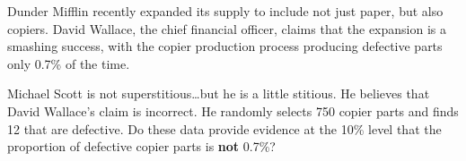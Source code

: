 \documentclass[noanswers]{exam}
\begin{document}
\begin{questions}

\newpage

\question Dunder Mifflin recently expanded its supply to include not just paper, but also copiers. David Wallace, the chief financial officer, claims that the expansion is a smashing success, with the copier production process producing defective parts only 0.7\% of the time.
    
    \vspace{3mm}
        
    Michael Scott is not superstitious\dots but he is a little stitious. He believes that David Wallace's claim is incorrect. He randomly selects 750 copier parts and finds 12 that are defective. Do these data provide evidence at the 10\% level that the proportion of defective copier parts is \textbf{not} 0.7\%?


\end{questions}
\end{document}
